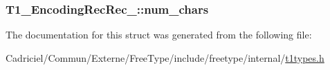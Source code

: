 \hypertarget{struct_t1___encoding_rec_rec___af1468d5bad99cccebeb0387713999e9c}{
\subsubsection[{num\-\_\-chars}]{ T1\-\_\-\-Encoding\-Rec\-Rec\-\_\-\-::num\-\_\-chars}}\label{struct_t1___encoding_rec_rec___af1468d5bad99cccebeb0387713999e9c}


The documentation for this struct was generated from the following file\-:\begin{DoxyCompactItemize}
\item 
Cadriciel/\-Commun/\-Externe/\-Free\-Type/include/freetype/internal/\hyperlink{t1types_8h}{t1types.\-h}\end{DoxyCompactItemize}
